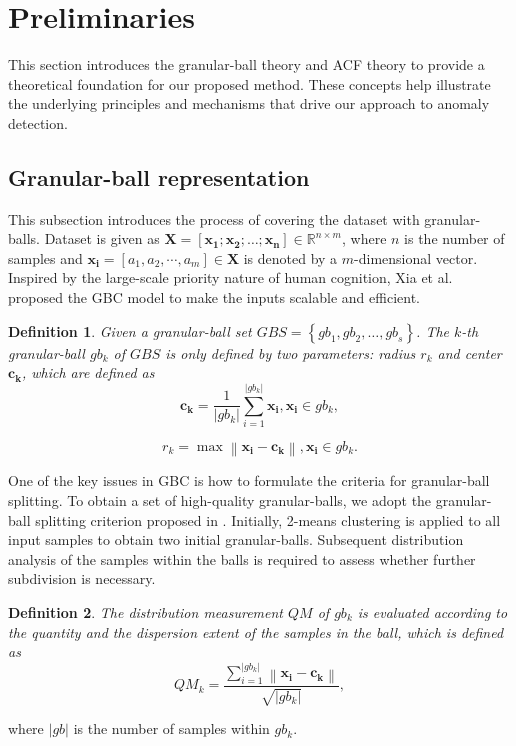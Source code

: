 \documentclass[times, review, 10pt]{elsarticle}
\newtheorem{definition}{Definition}
\begin{document}
\section{Preliminaries}
\label{Preliminaries}
This section introduces the granular-ball theory and ACF theory to provide a theoretical foundation for our proposed method. These concepts help illustrate the underlying principles and mechanisms that drive our approach to anomaly detection.

\subsection{Granular-ball representation}
\label{GB representation}
This subsection introduces the process of covering the dataset with granular-balls.
Dataset is given as $\boldsymbol{X} =\left[\boldsymbol{x_1} ; \boldsymbol{x_2} ; \ldots ; \boldsymbol{x_n} \right] \in \mathbb{R}^{n \times m}$, where $n$ is the number of samples and $\boldsymbol{x_i}=\left[a_1, a_2, \cdots, a_m\right] \in \boldsymbol{X}$ is
denoted by a $m$-dimensional vector. Inspired by the large-scale priority nature of human cognition, Xia et al. \cite{xia2019granular} proposed the GBC model to make the inputs scalable and efficient. 

\begin{definition}
Given a granular-ball set $GBS=\left\{{gb}_1,{gb}_2, \ldots, {gb}_{{s}}\right\}$.
The $k$-th granular-ball $gb_k$ of $GBS$ is only defined by two parameters: radius $r_k$ and center $\boldsymbol{c_k}$, which are defined as
\begin{equation}
\boldsymbol{c_k}=\frac{1}{|gb_k|} \sum_{i=1}^{|g b_k|} \boldsymbol{x_i}, \boldsymbol{x_i} \in g b_k,
\label{Eq:centers}
\end{equation}

\begin{equation}
r_k=\max \left\|\boldsymbol{x_i}-\boldsymbol{c_k}\right\|, \boldsymbol{x_i} \in g b_k.
\label{Eq:radius}
\end{equation}
\end{definition}


One of the key issues in GBC is how to formulate the criteria for granular-ball splitting. To obtain a set of high-quality granular-balls, we adopt the granular-ball splitting criterion proposed in \cite{xie2023efficient}. Initially, 2-means clustering is applied to all input samples to obtain two initial granular-balls. Subsequent distribution analysis of the samples within the balls is required to assess whether further subdivision is necessary.
\begin{definition}
The distribution measurement $QM$ of $gb_k$ is evaluated according to the quantity and the dispersion extent of the samples in the ball, which is defined as
\begin{equation}
QM_k=\frac{\sum\limits_{i=1}^{|g b_k|}\left\|\boldsymbol{x_i}-\boldsymbol{c_k}\right\|}{\sqrt{|gb_k|}},
\end{equation}
\end{definition}
where $|gb|$ is the number of samples within $gb_k$. 
\end{document}
